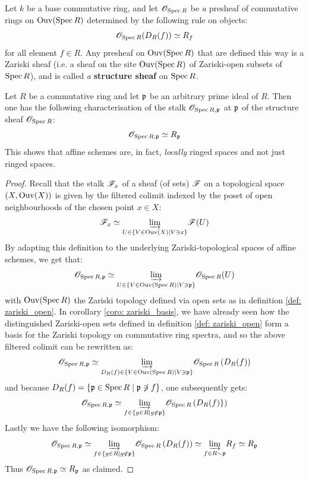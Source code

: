             \begin{proposition} \label{prop: structure_sheaf} 
                Let $k$ be a base commutative ring, and let $\mathscr{O}_{\operatorname{Spec} R}$ be \textit{a} presheaf of commutative rings on $\mathrm{Ouv}(\operatorname{Spec} R)$ determined by the following rule on objects:
                    $$\mathscr{O}_{\operatorname{Spec} R}(D_R(f)) \simeq R_f$$
                for all element $f \in R$. Any presheaf on $\mathrm{Ouv}(\operatorname{Spec} R)$ that are defined this way is a Zariski sheaf (i.e. a sheaf on the site $\mathrm{Ouv}(\operatorname{Spec} R)$ of Zariski-open subsets of $\operatorname{Spec} R$), and is called \textit{a} \textbf{structure sheaf} on $\operatorname{Spec} R$.
            \end{proposition}
            \begin{corollary} \label{coro: structure_sheaf_properties}
                Let $R$ be a commutative ring and let $\mathfrak{p}$ be an arbitrary prime ideal of $R$. Then one has the following characterisation of the stalk $\mathscr{O}_{\operatorname{Spec} R, \mathfrak{p}}$ at $\mathfrak{p}$ of the structure sheaf $\mathscr{O}_{\operatorname{Spec} R}$:
                    $$\mathscr{O}_{\operatorname{Spec} R, \mathfrak{p}} \simeq R_{\mathfrak{p}}$$
                This shows that affine schemes are, in fact, \textit{locally} ringed spaces and not just ringed spaces. 
            \end{corollary} 
                \begin{proof}
                    Recall that the stalk $\mathscr{F}_x$ of a sheaf (of sets) $\mathscr{F}$ on a topological space $(X, \mathrm{Ouv}(X))$ is given by the filtered colimit indexed by the poset of open neighbourhoods of the chosen point $x \in X$:
                        $$\mathscr{F}_x \simeq \underset{U \in \{V \in \mathrm{Ouv}(X) \mid V \ni x\}}{\varinjlim} \mathscr{F}(U)$$
                    By adapting this definition to the underlying Zariski-topological spaces of affine schemes, we get that:
                        $$\mathscr{O}_{\operatorname{Spec} R, \mathfrak{p}} \simeq \underset{U \in \{V \in \mathrm{Ouv}(\operatorname{Spec} R) \mid V \ni \mathfrak{p}\}}{\varinjlim} \mathscr{O}_{\operatorname{Spec} R}(U)$$
                    with $\mathrm{Ouv}(\operatorname{Spec} R)$ the Zariski topology defined via open sets as in definition \ref{def: zariski_open}. In corollary \ref{coro: zariski_basis}, we have already seen how the distinguished Zariski-open sets defined in definition \ref{def: zariski_open} form a basis for the Zariski topology on commutative ring spectra, and so the above filtered colimit can be rewritten as:
                        $$\mathscr{O}_{\operatorname{Spec} R, \mathfrak{p}} \simeq \underset{D_R(f) \in \{V \in \mathrm{Ouv}(\operatorname{Spec} R) \mid V \ni \mathfrak{p}\}}{\varinjlim} \mathscr{O}_{\operatorname{Spec} R}\left(D_R(f)\right)$$
                    and because $D_R(f) = \{\mathfrak{p} \in \operatorname{Spec} R \mid \mathfrak{p} \not \ni f\}$, one subsequently gets:
                        $$\mathscr{O}_{\operatorname{Spec} R, \mathfrak{p}} \simeq \underset{f \in \{g \in R \mid g \not \in \mathfrak{p}\}}{\varinjlim} \mathscr{O}_{\operatorname{Spec} R}\left(D_R(f)\}\right)$$
                    Lastly we have the following isomorphism:
                        $$\mathscr{O}_{\operatorname{Spec} R, \mathfrak{p}} \simeq \underset{f \in \{g \in R \mid g \not \in \mathfrak{p}\}}{\varinjlim} \mathscr{O}_{\operatorname{Spec} R}\left(D_R(f)\right) \simeq \underset{f \in R \smallsetminus \mathfrak{p}}{\varinjlim} R_f \simeq R_{\mathfrak{p}}$$
                    Thus $\mathscr{O}_{\operatorname{Spec} R, \mathfrak{p}} \simeq R_{\mathfrak{p}}$ as claimed.
                \end{proof}
                
